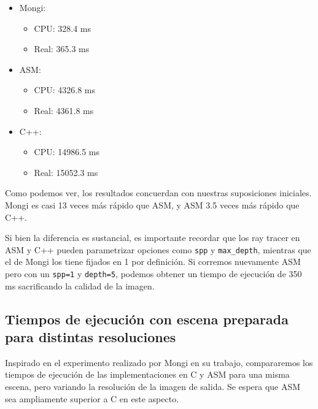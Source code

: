 \begin{itemize}
    \item Mongi:
        \begin{itemize}
            \item CPU: 328.4 ms
            \item Real: 365.3 ms
        \end{itemize}
    \item ASM:
        \begin{itemize}
            \item CPU: 4326.8 ms
            \item Real: 4361.8 ms
        \end{itemize}
    \item C++:
        \begin{itemize}
            \item CPU: 14986.5 ms
            \item Real: 15052.3 ms
        \end{itemize}
\end{itemize}

Como podemos ver, los resultados concuerdan con nuestras suposiciones iniciales.
Mongi es casi 13 veces más rápido que ASM, y ASM 3.5 veces más rápido que C++.

Si bien la diferencia es sustancial, es importante recordar que los ray tracer
en ASM y C++ pueden parametrizar opciones como \texttt{spp} y
\texttt{max\_depth}, mientras que el de Mongi los tiene fijados en 1 por
definición. Si corremos nuevamente ASM pero con un \texttt{spp=1} y
\texttt{depth=5}, podemos obtener un tiempo de ejecución de 350 ms sacrificando
la calidad de la imagen.


\subsection{Tiempos de ejecución con escena preparada para distintas
resoluciones}

Inspirado en el experimento realizado por Mongi en su trabajo, compararemos los
tiempos de ejecución de las implementaciones en C y ASM para una misma escena,
pero variando la resolución de la imagen de salida. Se espera que ASM sea
ampliamente superior a C en este aspecto.


